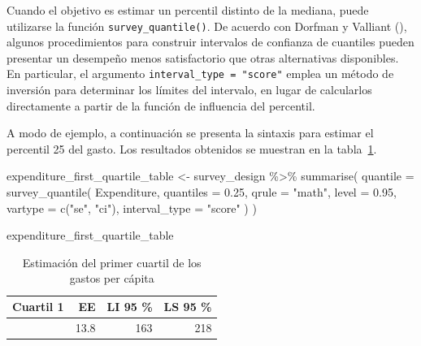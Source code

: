 \documentclass[
  spanish,
  11pt,
  letterpaper,
  oneside,
  open=any]{scrbook}
\newenvironment{Shaded}{\begin{snugshade}}{\end{snugshade}}
\newcommand{\AttributeTok}[1]{\textcolor[rgb]{0.40,0.45,0.13}{#1}}
\newcommand{\FloatTok}[1]{\textcolor[rgb]{0.68,0.00,0.00}{#1}}
\newcommand{\FunctionTok}[1]{\textcolor[rgb]{0.28,0.35,0.67}{#1}}
\newcommand{\NormalTok}[1]{\textcolor[rgb]{0.00,0.23,0.31}{#1}}
\newcommand{\OtherTok}[1]{\textcolor[rgb]{0.00,0.23,0.31}{#1}}
\newcommand{\SpecialCharTok}[1]{\textcolor[rgb]{0.37,0.37,0.37}{#1}}
\newcommand{\StringTok}[1]{\textcolor[rgb]{0.13,0.47,0.30}{#1}}
\begin{document}
Cuando el objetivo es estimar un percentil distinto de la mediana, puede
utilizarse la función \texttt{survey\_quantile()}. De acuerdo con
Dorfman y Valliant (), algunos
procedimientos para construir intervalos de confianza de cuantiles
pueden presentar un desempeño menos satisfactorio que otras alternativas
disponibles. En particular, el argumento
\texttt{interval\_type\ =\ "score"} emplea un método de inversión para
determinar los límites del intervalo, en lugar de calcularlos
directamente a partir de la función de influencia del percentil.

A modo de ejemplo, a continuación se presenta la sintaxis para estimar
el percentil 25 del gasto. Los resultados obtenidos se muestran en la
tabla~\ref{tbl-cuantil-gasto}.

\begin{Shaded}
\begin{Highlighting}[]
\NormalTok{expenditure\_first\_quartile\_table }\OtherTok{\textless{}{-}}\NormalTok{ survey\_design }\SpecialCharTok{\%\textgreater{}\%}
  \FunctionTok{summarise}\NormalTok{(}
    \AttributeTok{quantile =} \FunctionTok{survey\_quantile}\NormalTok{(}
\NormalTok{      Expenditure,}
      \AttributeTok{quantiles =} \FloatTok{0.25}\NormalTok{,}
      \AttributeTok{qrule =} \StringTok{"math"}\NormalTok{,}
      \AttributeTok{level =} \FloatTok{0.95}\NormalTok{,}
      \AttributeTok{vartype =} \FunctionTok{c}\NormalTok{(}\StringTok{"se"}\NormalTok{, }\StringTok{"ci"}\NormalTok{),}
      \AttributeTok{interval\_type =} \StringTok{"score"}
\NormalTok{    )}
\NormalTok{  )}

\NormalTok{expenditure\_first\_quartile\_table}
\end{Highlighting}
\end{Shaded}

{

\begin{longtable}[]{@{}rrrr@{}}

\caption{\label{tbl-cuantil-gasto}Estimación del primer cuartil de los
gastos per cápita}

\tabularnewline

\toprule\noalign{}
Cuartil 1 & EE & LI 95 \% & LS 95 \% \\
\midrule\noalign{}
\endhead
\bottomrule\noalign{}
\endlastfoot
200 & 13.8 & 163 & 218 \\

\end{longtable}

}
\end{document}
